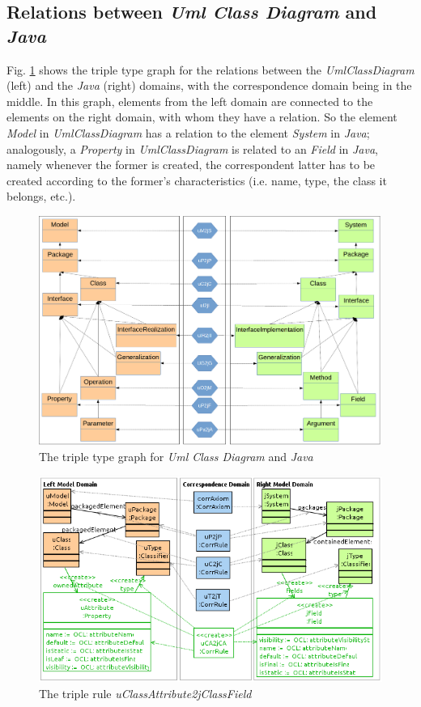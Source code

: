 \documentclass[tuberlin,cic,tc,english,noabntcite]{iiufrgs}
\begin{document}

\subsection{Relations between \emph{Uml Class Diagram} and \emph{Java}}
\label{subsec:umlClassDiagram2Java}
Fig. \ref{fig:umlClassDiagram2java_type} shows the triple type graph for the relations between the \emph{UmlClassDiagram} (left) and the \emph{Java} (right) domains, with the correspondence domain being in the middle. In this graph, elements from the left domain are connected to the elements on the right domain, with whom they have a relation. So the element \emph{Model} in \emph{UmlClassDiagram} has a relation to the element \emph{System} in \emph{Java}; analogously, a \emph{Property} in \emph{UmlClassDiagram} is related to an \emph{Field} in \emph{Java}, namely whenever the former is created, the correspondent latter has to be created according to the former's characteristics (i.e. name, type, the class it belongs, etc.).

\begin{figure}[H]
    \caption{The triple type graph for \emph{Uml Class Diagram} and \emph{Java}}
    \begin{center}
        \includegraphics[width=.7\textwidth]{umlClassDiagram2java_type}
    \end{center}
    \label{fig:umlClassDiagram2java_type}
\end{figure}

\begin{figure}[h]
    \caption{The triple rule \emph{uClassAttribute2jClassField}}
    \begin{center}
       	\includegraphics[width=.7\textwidth]{uCAttribute2jCField}
    \end{center}
    \label{fig:uCAttribute2jCField}
\end{figure}
\end{document}
